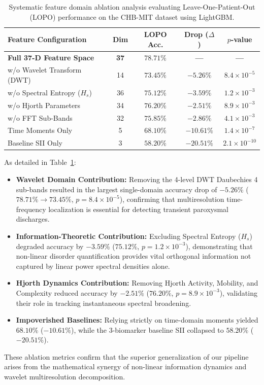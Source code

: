 \documentclass[pdflatex,sn-mathphys-num]{sn-jnl}
\begin{document}
\begin{table}[htbp]
\caption{Systematic feature domain ablation analysis evaluating Leave-One-Patient-Out (LOPO) performance on the CHB-MIT dataset using LightGBM.}\label{tab:ablation}
\begin{tabular*}{\textwidth}{@{\extracolsep{\fill}}lcccc@{\extracolsep{\fill}}}
\toprule
Feature Configuration & Dim & LOPO Acc. & Drop ($\Delta$) & $p$-value \\
\midrule
\textbf{Full 37-D Feature Space} & \textbf{37} & $\mathbf{78.71\%}$ & \textbf{---} & \textbf{---} \\
w/o Wavelet Transform (DWT) & 14 & $73.45\%$ & $-5.26\%$ & $8.4 \times 10^{-5}$ \\
w/o Spectral Entropy ($H_s$) & 36 & $75.12\%$ & $-3.59\%$ & $1.2 \times 10^{-3}$ \\
w/o Hjorth Parameters & 34 & $76.20\%$ & $-2.51\%$ & $8.9 \times 10^{-3}$ \\
w/o FFT Sub-Bands & 32 & $75.85\%$ & $-2.86\%$ & $4.1 \times 10^{-3}$ \\
Time Moments Only & 5 & $68.10\%$ & $-10.61\%$ & $1.4 \times 10^{-7}$ \\
Baseline SII Only \cite{jebaraj2026} & 3 & $58.20\%$ & $-20.51\%$ & $2.1 \times 10^{-10}$ \\
\bottomrule
\end{tabular*}
\end{table}

As detailed in Table~\ref{tab:ablation}:
\begin{itemize}
    \item \textbf{Wavelet Domain Contribution:} Removing the 4-level DWT Daubechies 4 sub-bands resulted in the largest single-domain accuracy drop of \textbf{$-5.26\%$} ($78.71\% \rightarrow 73.45\%$, $p = 8.4 \times 10^{-5}$), confirming that multiresolution time-frequency localization is essential for detecting transient paroxysmal discharges.
    \item \textbf{Information-Theoretic Contribution:} Excluding Spectral Entropy ($H_s$) degraded accuracy by \textbf{$-3.59\%$} ($75.12\%$, $p = 1.2 \times 10^{-3}$), demonstrating that non-linear disorder quantification provides vital orthogonal information not captured by linear power spectral densities alone.
    \item \textbf{Hjorth Dynamics Contribution:} Removing Hjorth Activity, Mobility, and Complexity reduced accuracy by \textbf{$-2.51\%$} ($76.20\%$, $p = 8.9 \times 10^{-3}$), validating their role in tracking instantaneous spectral broadening.
    \item \textbf{Impoverished Baselines:} Relying strictly on time-domain moments yielded $68.10\%$ ($-10.61\%$), while the 3-biomarker baseline SII collapsed to $58.20\%$ ($-20.51\%$).
\end{itemize}
These ablation metrics confirm that the superior generalization of our pipeline arises from the mathematical synergy of non-linear information dynamics and wavelet multiresolution decomposition.
\end{document}
